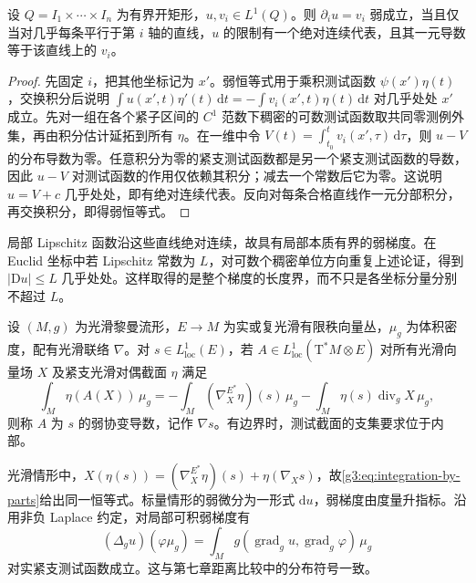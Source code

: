 \begin{proposition}\label{g3:prop:weak-line-slices}
	设 \(Q=I_1\times\cdots\times I_n\) 为有界开矩形，\(u,v_i\in L^1(Q)\)。则 \(\partial_i u=v_i\) 弱成立，当且仅当对几乎每条平行于第 \(i\) 轴的直线，\(u\) 的限制有一个绝对连续代表，且其一元导数等于该直线上的 \(v_i\)。
\end{proposition}
\begin{proof}
	先固定 \(i\)，把其他坐标记为 \(x'\)。弱恒等式用于乘积测试函数 \(\psi(x')\eta(t)\)，交换积分后说明
	\(\int u(x',t)\eta'(t)\,\mathrm dt=-\int v_i(x',t)\eta(t)\,\mathrm dt\)
	对几乎处处 \(x'\) 成立。先对一组在各个紧子区间的 \(C^1\) 范数下稠密的可数测试函数取共同零测例外集，再由积分估计延拓到所有 \(\eta\)。在一维中令 \(V(t)=\int_{t_0}^tv_i(x',\tau)\,\mathrm d\tau\)，则 \(u-V\) 的分布导数为零。任意积分为零的紧支测试函数都是另一个紧支测试函数的导数，因此 \(u-V\) 对测试函数的作用仅依赖其积分；减去一个常数后它为零。这说明 \(u=V+c\) 几乎处处，即有绝对连续代表。反向对每条合格直线作一元分部积分，再交换积分，即得弱恒等式。
\end{proof}

局部 Lipschitz 函数沿这些直线绝对连续，故具有局部本质有界的弱梯度。在 Euclid 坐标中若 Lipschitz 常数为 \(L\)，对可数个稠密单位方向重复上述论证，得到 \(|\mathrm Du|\le L\) 几乎处处。这样取得的是整个梯度的长度界，而不只是各坐标分量分别不超过 \(L\)。

\begin{definition}\label{g3:def:weak-covariant-derivative}
	设 \((M,g)\) 为光滑黎曼流形，\(E\to M\) 为实或复光滑有限秩向量丛，\(\mu_g\) 为体积密度，配有光滑联络 \(\nabla\)。对 \(s\in L^1_{\mathrm{loc}}(E)\)，若 \(A\in L^1_{\mathrm{loc}}(\mathrm T^*M\otimes E)\) 对所有光滑向量场 \(X\) 及紧支光滑对偶截面 \(\eta\) 满足
	\begin{equation}\label{g3:eq:weak-covariant-parts}
		\int_M\eta(A(X))\,\mu_g
		=-\int_M(\nabla_X^{E^*}\eta)(s)\,\mu_g
		-\int_M\eta(s)\operatorname{div}_gX\,\mu_g,
	\end{equation}
	则称 \(A\) 为 \(s\) 的弱协变导数，记作 \(\nabla s\)。有边界时，测试截面的支集要求位于内部。
\end{definition}

光滑情形中，\(X(\eta(s))=(\nabla_X^{E^*}\eta)(s)+\eta(\nabla_Xs)\)，故\cref{g3:eq:integration-by-parts}给出同一恒等式。标量情形的弱微分为一形式 \(\mathrm du\)，弱梯度由度量升指标。沿用非负 Laplace 约定，对局部可积弱梯度有
\[
	(\Delta_g u)(\varphi\mu_g)=\int_M g(\operatorname{grad}_gu,\operatorname{grad}_g\varphi)\,\mu_g
\]
对实紧支测试函数成立。这与第七章距离比较中的分布符号一致。

